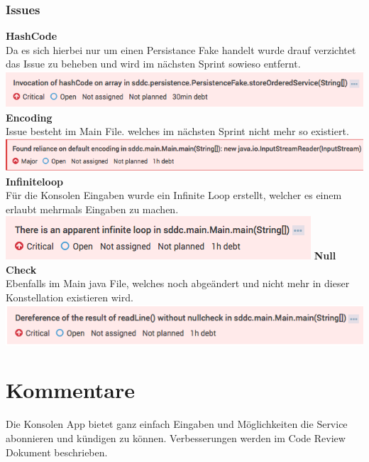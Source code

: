 \subsubsection{Issues}
\textbf{HashCode}\\
Da es sich hierbei nur um einen Persistance Fake handelt wurde drauf verzichtet 
das Issue zu beheben und wird im nächsten Sprint sowieso entfernt.
\newline
\includegraphics[width=\textwidth]{./10_Protokolle/04_Testprotokoll/images/Sprint1/hashcode}
\newline
\textbf{Encoding}\\
Issue besteht im Main File. welches im nächsten Sprint nicht mehr so existiert.
\newline
\includegraphics[width=\textwidth]{./10_Protokolle/04_Testprotokoll/images/Sprint1/encoding}
\newline
\textbf{Infiniteloop}\\
Für die Konsolen Eingaben wurde ein Infinite Loop erstellt, welcher es einem 
erlaubt mehrmals Eingaben zu machen.
\newline
\includegraphics[width=\textwidth]{./10_Protokolle/04_Testprotokoll/images/Sprint1/infiniteloop}
\newline
\textbf{Null Check}\\
Ebenfalls im Main java File, welches noch abgeändert und nicht mehr in dieser 
Konstellation existieren wird.
\newline
\includegraphics[width=\textwidth]{./10_Protokolle/04_Testprotokoll/images/Sprint1/nullcheck}

\section{Kommentare}

Die Konsolen App bietet ganz einfach Eingaben und Möglichkeiten die Service 
abonnieren und kündigen zu können.
Verbesserungen werden im Code Review Dokument beschrieben.
